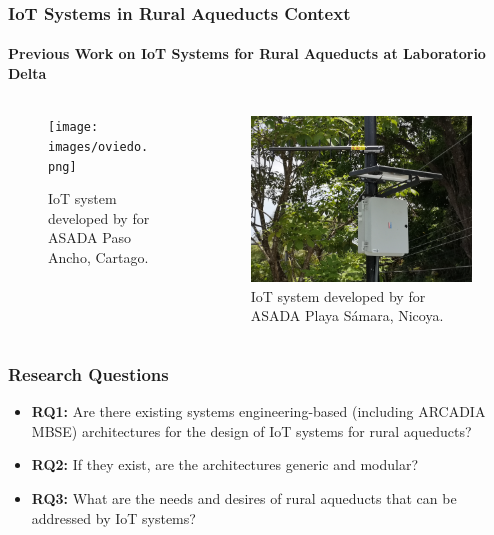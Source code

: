 \documentclass{beamer}
\begin{document}
\begin{frame}
    \frametitle{\small IoT Systems in Rural Aqueducts Context}
    \framesubtitle{Previous Work on IoT Systems for Rural Aqueducts at Laboratorio Delta}

    \begin{columns}[T] %
        \begin{column}{0.5\textwidth}
            \begin{figure}
                \texttt{[image: images/oviedo.png]}
                \caption{IoT system developed by \cite{Oviedo2024} for ASADA Paso Ancho, Cartago.}
            \end{figure}
        \end{column}
        \begin{column}{0.5\textwidth}
            \begin{figure}
                \includegraphics[width=\columnwidth]{images/solorzano.png}
                \caption{IoT system developed by \cite{Solorzano2021} for ASADA Playa Sámara, Nicoya.}
            \end{figure}
        \end{column}
    \end{columns}
\end{frame}

\begin{frame}
    \frametitle{Research Questions}

    \begin{itemize}
        \item \textbf{RQ1:} Are there existing systems engineering-based (including ARCADIA MBSE) architectures for the design of IoT systems for rural aqueducts?
        \item \textbf{RQ2:} If they exist, are the architectures generic and modular?
        \item \textbf{RQ3:} What are the needs and desires of rural aqueducts that can be addressed by IoT systems?
    \end{itemize} 
\end{frame}
\end{document}
